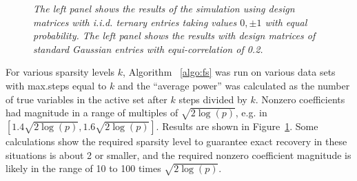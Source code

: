 \documentclass{imsart}
\begin{document}
\begin{figure}
\begin{center}
\hspace{-15pt}
\caption{\small \it The left panel shows the results of the simulation
  using design matrices with i.i.d. ternary entries taking values $0,
  \pm 1$ with equal probability. The left panel shows the results
  with design matrices of standard Gaussian entries with
  equi-correlation of 0.2. }
\label{fig:fwdstepsim}
\end{center}
\end{figure}

For various sparsity levels $k$, Algorithm ~\ref{algo:fs} was run on
various data sets with max.steps equal to $k$ and the ``average
power'' was calculated as the number of true variables in the active
set after $k$ steps divided by $k$. Nonzero coefficients had magnitude
in a range of multiples of $\sqrt{2\log(p)}$, e.g. in $[1.4
\sqrt{2\log(p)}, 1.6 \sqrt{2\log(p)}]$. Results are shown in
Figure~\ref{fig:fwdstepsim}. Some calculations show the required
sparsity level to guarantee exact recovery in these situations is
about 2 or smaller, and the required nonzero coefficient magnitude is
likely in the range of 10 to 100 times $\sqrt{2\log(p)}$. 
\end{document}
